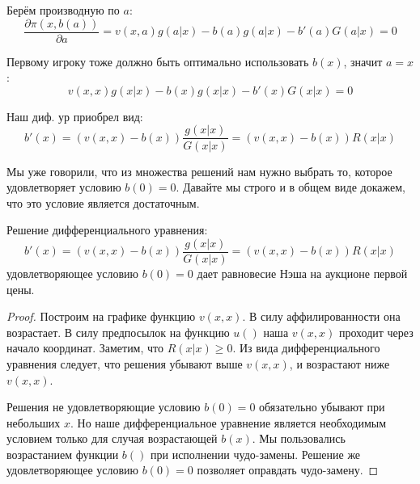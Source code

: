 \begin{itemize}
Берём производную по $ a $:
\begin{equation}
\frac{\partial \pi(x,b(a))}{\partial a}=v(x,a)g(a|x)-b(a)g(a|x)-b'(a)G(a|x)=0
\end{equation}

Первому игроку тоже должно быть оптимально использовать $ b(x) $, значит $ a=x $:
\begin{equation}
v(x,x)g(x|x)-b(x)g(x|x)-b'(x)G(x|x)=0
\end{equation}

Наш диф. ур приобрел вид:
\begin{equation}
\label{b_first_de}
b'(x)=(v(x,x)-b(x))\frac{g(x|x)}{G(x|x)}=(v(x,x)-b(x))R(x|x)
\end{equation}

Мы уже говорили, что из множества решений нам нужно выбрать то, которое удовлетворяет условию $ b(0)=0 $. Давайте мы строго и в общем виде докажем, что это условие является достаточным.


\begin{myth}
Решение дифференциального уравнения:
\begin{equation}
b'(x)=(v(x,x)-b(x))\frac{g(x|x)}{G(x|x)}=(v(x,x)-b(x))R(x|x)
\end{equation}
удовлетворяющее условию $ b(0)=0 $ дает равновесие Нэша на аукционе первой цены.
\end{myth}

\begin{proof}


Построим на графике функцию $ v(x,x) $. В силу аффилированности она возрастает. В силу предпосылок на функцию $ u() $ наша $ v(x,x) $ проходит через начало координат. Заметим, что $ R(x|x)\geq 0 $. Из вида дифференциального уравнения следует, что решения убывают выше $ v(x,x) $, и возрастают ниже $ v(x,x) $.




Решения не удовлетворяющие условию $ b(0)=0 $ обязательно убывают при небольших $ x $. Но наше дифференциальное уравнение является необходимым условием только для случая возрастающей $ b(x) $. Мы пользовались возрастанием функции $ b() $ при исполнении чудо-замены. Решение же удовлетворяющее условию $ b(0)=0 $ позволяет оправдать чудо-замену.


\end{proof}
\end{itemize}
